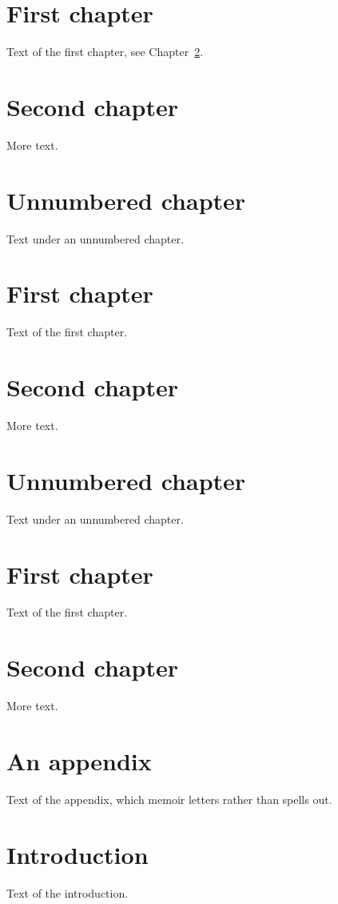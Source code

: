 \documentclass[11pt,oneside]{memoir}
\begin{document}
\chapter{First chapter}
Text of the first chapter, see Chapter~\ref{sec:two}.
\chapter{Second chapter}\label{sec:two}
More text.
\chapter*{Unnumbered chapter}
Text under an unnumbered chapter.
\chapter{First chapter}
Text of the first chapter.
\chapter{Second chapter}
More text.
\chapter*{Unnumbered chapter}
Text under an unnumbered chapter.
\chapter{First chapter}
Text of the first chapter.
\chapter{Second chapter}
More text.
\appendix
\chapter{An appendix}
Text of the appendix, which memoir letters rather than spells out.
\chapter{Introduction}
Text of the introduction.
\end{document}

